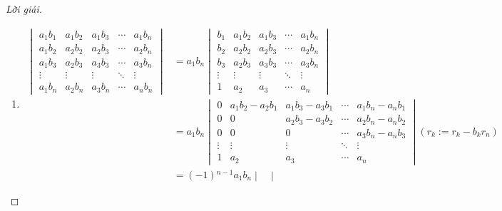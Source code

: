 \documentclass[class=nhvh-linear-algebra,crop=false]{standalone}
\begin{document}
\begin{proof}[Lời giải]
	\begin{enumerate}[label = (\alph*)]
		\item
		      \begin{align*}
			      \begin{vmatrix}
				      a_{1}b_{1} & a_{1}b_{2} & a_{1}b_{3} & \cdots & a_{1}b_{n} \\
				      a_{1}b_{2} & a_{2}b_{2} & a_{2}b_{3} & \cdots & a_{2}b_{n} \\
				      a_{1}b_{3} & a_{2}b_{3} & a_{3}b_{3} & \cdots & a_{3}b_{n} \\
				      \vdots     & \vdots     & \vdots     & \ddots & \vdots     \\
				      a_{1}b_{n} & a_{2}b_{n} & a_{3}b_{n} & \cdots & a_{n}b_{n}
			      \end{vmatrix}
			       & =
			      a_{1}b_{n}
			      \begin{vmatrix}
				      b_{1}  & a_{1}b_{2} & a_{1}b_{3} & \cdots & a_{1}b_{n} \\
				      b_{2}  & a_{2}b_{2} & a_{2}b_{3} & \cdots & a_{2}b_{n} \\
				      b_{3}  & a_{2}b_{3} & a_{3}b_{3} & \cdots & a_{3}b_{n} \\
				      \vdots & \vdots     & \vdots     & \ddots & \vdots     \\
				      1      & a_{2}      & a_{3}      & \cdots & a_{n}
			      \end{vmatrix}                                            \\
			       & =
			      a_{1}b_{n}
			      \begin{vmatrix}
				      0      & a_{1}b_{2} - a_{2}b_{1} & a_{1}b_{3} - a_{3}b_{1} & \cdots & a_{1}b_{n} - a_{n}b_{1} \\
				      0      & 0                       & a_{2}b_{3} - a_{3}b_{2} & \cdots & a_{2}b_{n} - a_{n}b_{2} \\
				      0      & 0                       & 0                       & \cdots & a_{3}b_{n} - a_{n}b_{3} \\
				      \vdots & \vdots                  & \vdots                  & \ddots & \vdots                  \\
				      1      & a_{2}                   & a_{3}                   & \cdots & a_{n}
			      \end{vmatrix} (r_{k}:= r_{k} - b_{k}r_{n})     \\
			       & =
			      (-1){}^{n-1}a_{1}b_{n}
			      \begin{vmatrix}

\end{vmatrix}
\end{align*}
\end{enumerate}
\end{proof}
\end{document}
